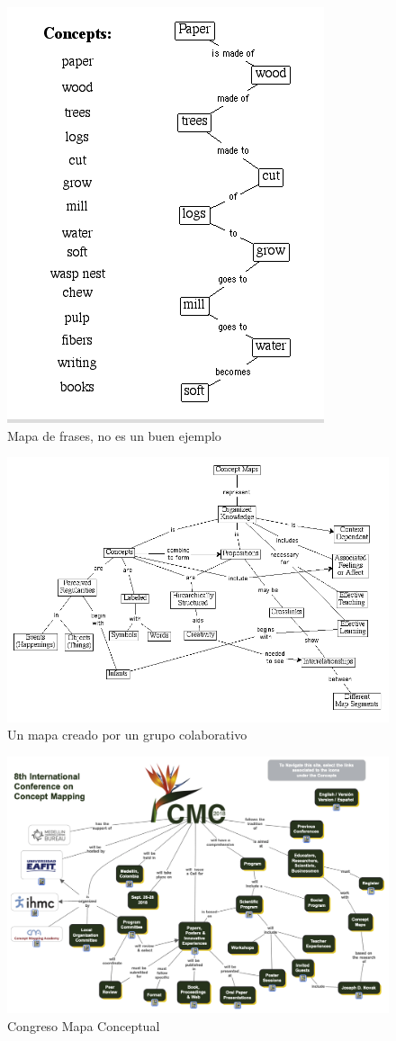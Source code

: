 \documentclass[
	11pt, %
]{beamer}
\begin{document}
\begin{frame}
  \begin{figure}[h]
    \includegraphics[width=0.5\linewidth]{paper.png}
    \caption{Mapa de frases, no es un buen ejemplo}
    \centering
  \end{figure}
\end{frame}

\begin{frame}
  \begin{figure}[h]
    \includegraphics[width=0.9\linewidth]{cmap.png}
    \caption{Un mapa creado por un grupo colaborativo}
    \centering
  \end{figure}
\end{frame}

\begin{frame}
  \begin{figure}[h]
    \includegraphics[width=0.7\linewidth]{conferencia.png}
    \caption{Congreso Mapa Conceptual}
    \centering
  \end{figure}
\end{frame}
\end{document}
